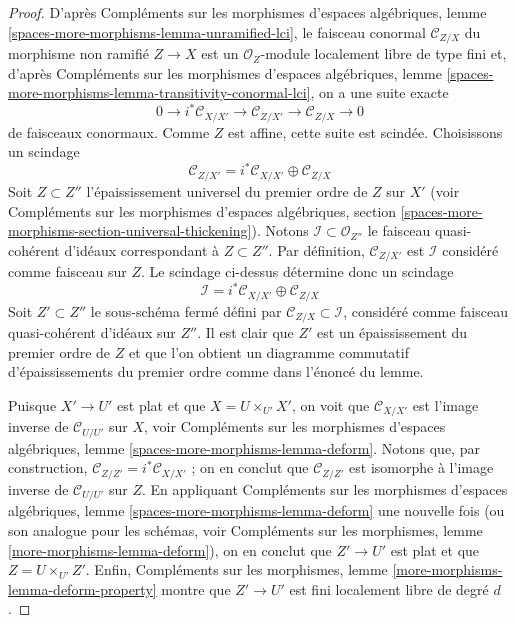 \begin{proof}
D'après
Compléments sur les morphismes d'espaces algébriques,
lemme \ref{spaces-more-morphisms-lemma-unramified-lci},
le faisceau conormal $\mathcal{C}_{Z/X}$ du morphisme non ramifié $Z \to X$
est un $\mathcal{O}_Z$-module localement libre de type fini et, d'après
Compléments sur les morphismes d'espaces algébriques,
lemme \ref{spaces-more-morphisms-lemma-transitivity-conormal-lci},
on a une suite exacte
$$
0 \to i^*\mathcal{C}_{X/X'} \to
\mathcal{C}_{Z/X'} \to
\mathcal{C}_{Z/X} \to 0
$$
de faisceaux conormaux. Comme $Z$ est affine, cette suite est scindée. Choisissons
un scindage
$$
\mathcal{C}_{Z/X'} = i^*\mathcal{C}_{X/X'} \oplus \mathcal{C}_{Z/X}
$$
Soit $Z \subset Z''$ l'épaississement universel du premier ordre de $Z$
sur $X'$ (voir
Compléments sur les morphismes d'espaces algébriques,
section \ref{spaces-more-morphisms-section-universal-thickening}).
Notons $\mathcal{I} \subset \mathcal{O}_{Z''}$ le faisceau quasi-cohérent
d'idéaux correspondant à $Z \subset Z''$. Par définition,
$\mathcal{C}_{Z/X'}$ est $\mathcal{I}$ considéré comme faisceau sur $Z$.
Le scindage ci-dessus détermine donc un scindage
$$
\mathcal{I} = i^*\mathcal{C}_{X/X'} \oplus \mathcal{C}_{Z/X}
$$
Soit $Z' \subset Z''$ le sous-schéma fermé défini par
$\mathcal{C}_{Z/X} \subset \mathcal{I}$, considéré comme faisceau quasi-cohérent
d'idéaux sur $Z''$. Il est clair que $Z'$ est un épaississement du premier ordre
de $Z$ et que l'on obtient un diagramme commutatif d'épaississements du premier ordre
comme dans l'énoncé du lemme.

\medskip\noindent
Puisque $X' \to U'$ est plat et que $X = U \times_{U'} X'$, on voit que
$\mathcal{C}_{X/X'}$ est l'image inverse de $\mathcal{C}_{U/U'}$ sur $X$, voir
Compléments sur les morphismes d'espaces algébriques, lemme \ref{spaces-more-morphisms-lemma-deform}.
Notons que, par construction, $\mathcal{C}_{Z/Z'} = i^*\mathcal{C}_{X/X'}$ ;
on en conclut que $\mathcal{C}_{Z/Z'}$ est isomorphe à l'image inverse
de $\mathcal{C}_{U/U'}$ sur $Z$. En appliquant
Compléments sur les morphismes d'espaces algébriques, lemme \ref{spaces-more-morphisms-lemma-deform}
une nouvelle fois (ou son analogue pour les schémas, voir
Compléments sur les morphismes, lemme \ref{more-morphisms-lemma-deform}),
on en conclut que $Z' \to U'$ est plat et que $Z = U \times_{U'} Z'$.
Enfin,
Compléments sur les morphismes, lemme \ref{more-morphisms-lemma-deform-property}
montre que $Z' \to U'$ est fini localement libre de degré $d$.
\end{proof}

